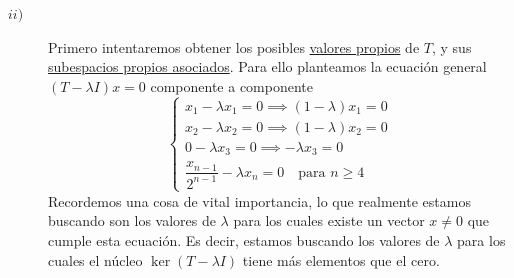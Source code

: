\begin{ejercicio}
\begin{description}
        \item[$ii)$] Primero intentaremos obtener los posibles \underline{valores propios} de $T$, y sus \underline{subespacios propios asociados}. Para ello planteamos la ecuación general $(T - \lambda I)x = 0$ componente a componente
        \begin{equation*}
            \begin{cases}
                x_1 - \lambda x_1 = 0 \implies (1 - \lambda)x_1 = 0 \\
                x_2 - \lambda x_2 = 0 \implies \left(1 - \lambda\right)x_2 = 0 \\
                0 - \lambda x_3 = 0 \implies -\lambda x_3 = 0 \\
                \dfrac{x_{n-1}}{2^{n-1}} - \lambda x_n = 0 \quad \text{para } n \geq 4
            \end{cases}
        \end{equation*}
        Recordemos una cosa de vital importancia, lo que realmente estamos buscando son los valores de $\lambda$ para los cuales existe un vector $x \neq 0$ que cumple esta ecuación. Es decir, estamos buscando los valores de $\lambda$ para los cuales el núcleo $\ker(T - \lambda I)$ tiene más elementos que el cero. \\


\end{description}
\end{ejercicio}
